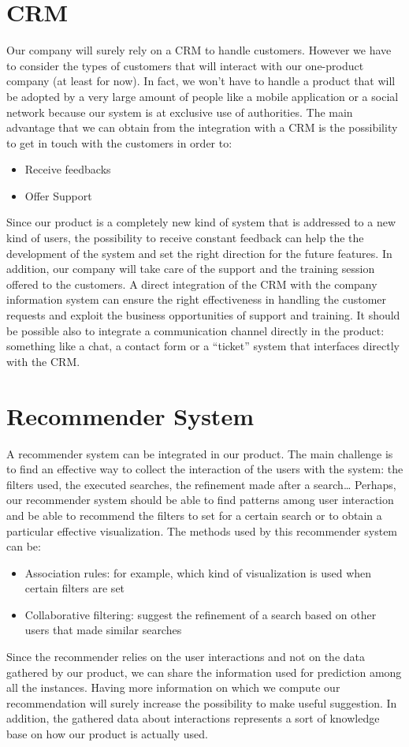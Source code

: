 \documentclass[../main.tex]{subfiles}
\begin{document}
    \section{CRM}
    Our company will surely rely on a CRM to handle customers. However we have to consider the types of customers that will interact with our one-product company (at least for now). In fact, we won’t have to handle a product that will be adopted by a very large amount of people like a mobile application or a social network because our system is at exclusive use of authorities.
    The main advantage that we can obtain from the integration with a CRM is the possibility to get in touch with the customers in order to:
    \begin{itemize}
        \item Receive feedbacks
        \item Offer Support
    \end{itemize}
    Since our product is a completely new kind of system that is addressed to a new kind of users, the possibility to receive constant feedback can help the the development of the system and set the right direction for the future features.
    In addition, our company will take care of the support and the training session offered to the customers. A direct integration of the CRM with the company information system can ensure the right effectiveness in handling the customer requests and exploit the business opportunities of support and training.
    It should be possible also to integrate a communication channel directly in the product: something like a chat, a contact form or a “ticket” system that interfaces directly with the CRM.

    \section{Recommender System}
    A recommender system can be integrated in our product. The main challenge is to find an effective way to collect the interaction of the users with the system: the filters used, the executed searches, the refinement made after a search…
    Perhaps, our recommender system should be able to find patterns among user interaction and be able to recommend the filters to set for a certain search or to obtain a particular effective visualization.
    The methods used by this recommender system can be:
    \begin{itemize}
        \item Association rules: for example, which kind of visualization is used when certain filters are set
        \item Collaborative filtering: suggest the refinement of a search based on other users that made similar searches
    \end{itemize}
    Since the recommender relies on the user interactions and not on the data gathered by our product, we can share the information used for prediction among all the instances. Having more information on which we compute our recommendation will surely increase the possibility to make useful suggestion. In addition, the gathered data about interactions represents a sort of knowledge base on how our product is actually used.
\end{document}
